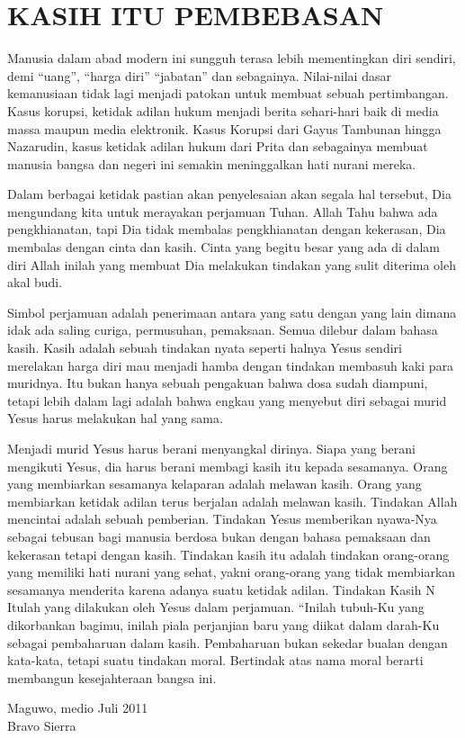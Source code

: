 \newpage
\section*{KASIH ITU PEMBEBASAN}
 
{\small Manusia dalam abad modern ini sungguh terasa lebih mementingkan diri sendiri, demi “uang”, “harga diri” “jabatan” dan sebagainya. Nilai-nilai dasar kemanusiaan tidak lagi menjadi patokan untuk membuat sebuah pertimbangan. Kasus korupsi, ketidak adilan hukum menjadi berita sehari-hari baik di media massa maupun media elektronik. Kasus Korupsi dari Gayus Tambunan hingga Nazarudin, kasus ketidak adilan hukum dari Prita dan sebagainya membuat manusia  bangsa dan negeri ini semakin meninggalkan hati nurani mereka.

Dalam berbagai ketidak pastian akan penyelesaian akan segala hal tersebut, Dia mengundang kita untuk merayakan perjamuan Tuhan. Allah Tahu bahwa ada pengkhianatan, tapi Dia tidak membalas pengkhianatan dengan kekerasan, Dia membalas dengan cinta dan kasih. Cinta yang begitu besar yang ada di dalam diri Allah inilah yang membuat Dia melakukan tindakan yang sulit diterima oleh akal budi. 


Simbol perjamuan adalah penerimaan antara yang satu dengan yang lain dimana idak ada saling curiga, permusuhan, pemaksaan. Semua dilebur dalam bahasa kasih. Kasih adalah sebuah tindakan nyata seperti halnya Yesus sendiri merelakan harga diri mau menjadi hamba dengan tindakan membasuh kaki para muridnya. Itu bukan hanya sebuah pengakuan bahwa dosa sudah diampuni, tetapi lebih dalam lagi adalah bahwa engkau yang menyebut diri sebagai murid Yesus harus melakukan hal yang sama. 

 Menjadi murid Yesus harus berani menyangkal dirinya. Siapa yang berani mengikuti Yesus, dia  harus berani membagi kasih itu kepada sesamanya. Orang yang membiarkan sesamanya kelaparan adalah melawan kasih. Orang yang membiarkan ketidak adilan terus berjalan adalah melawan kasih. Tindakan Allah mencintai adalah sebuah pemberian. Tindakan Yesus memberikan nyawa-Nya sebagai tebusan bagi  manusia berdosa bukan dengan bahasa pemaksaan dan kekerasan tetapi dengan kasih. Tindakan kasih itu adalah tindakan orang-orang yang memiliki hati nurani yang sehat, yakni  orang-orang yang tidak membiarkan sesamanya menderita karena adanya suatu ketidak adilan. Tindakan Kasih N
Itulah yang dilakukan oleh Yesus dalam perjamuan. “Inilah tubuh-Ku yang dikorbankan bagimu, inilah piala perjanjian baru yang diikat dalam darah-Ku sebagai pembaharuan dalam kasih. Pembaharuan bukan sekedar bualan dengan kata-kata, tetapi suatu tindakan moral. Bertindak atas nama moral berarti  membangun kesejahteraan bangsa ini.}

\vspace{0.5cm}

{\flushleft Maguwo, medio Juli 2011\\
Bravo Sierra}